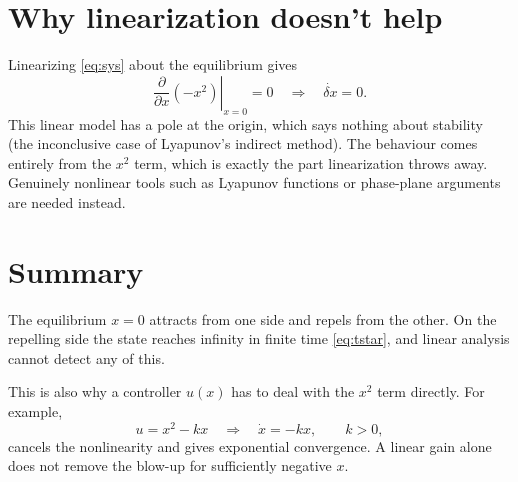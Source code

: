 \documentclass[11pt]{article}
\begin{document}
\section*{Why linearization doesn't help}
Linearizing \eqref{eq:sys} about the equilibrium gives
\begin{equation}
  \left.\frac{\partial}{\partial x}\left(-x^2\right)\right|_{x=0} = 0
  \quad\Longrightarrow\quad
  \dot{\delta x} = 0 .
  \label{eq:linearize}
\end{equation}
This linear model has a pole at the origin, which says nothing about stability (the inconclusive case of Lyapunov's indirect method). The behaviour comes entirely from the $x^2$ term, which is exactly the part linearization throws away. Genuinely nonlinear tools such as Lyapunov functions or phase-plane arguments are needed instead.

\section*{Summary}
The equilibrium $x = 0$ attracts from one side and repels from the other. On the repelling side the state reaches infinity in finite time \eqref{eq:tstar}, and linear analysis cannot detect any of this.

This is also why a controller $u(x)$ has to deal with the $x^2$ term directly. For example,
\begin{equation}
  u = x^2 - kx \quad\Longrightarrow\quad \dot{x} = -kx, \qquad k > 0,
  \label{eq:ctrl}
\end{equation}
cancels the nonlinearity and gives exponential convergence. A linear gain alone does not remove the blow-up for sufficiently negative $x$.
\end{document}
